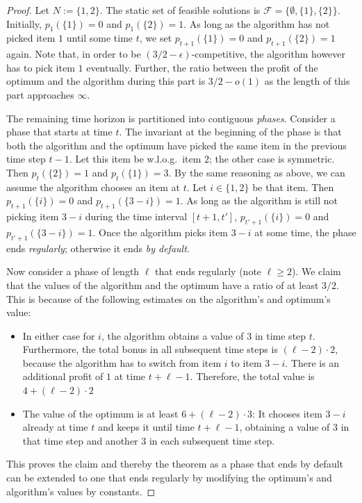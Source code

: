 \documentclass[a4paper]{book}
\newtheorem{proof}{\noindent{\bf Proof.} }
\begin{document}
\begin{proof}
	Let $N:=\{1,2\}$. The static set of feasible solutions is $\mathcal{F}=\{\emptyset,\{1\},\{2\}\}$. Initially, $p_1(\{1\})=0$ and $p_1(\{2\})=1$. As long as the algorithm has not picked item $1$ until some time $t$, we set $p_{t+1}(\{1\})=0$ and $p_{t+1}(\{2\})=1$ again. Note that, in order to be $(3/2-\epsilon)$-competitive, the algorithm however has to pick item $1$ eventually. Further, the ratio between the profit of the optimum and the algorithm during this part is $3/2-o(1)$ as the length of this part approaches $\infty$.
	
	The remaining time horizon is partitioned into contiguous \emph{phases}. Consider a phase that starts at time $t$. The invariant at the beginning of the phase is that both the algorithm and the optimum have picked the same item in the previous time step $t-1$. Let this item be w.l.o.g.\ item $2$; the other case is symmetric. Then $p_t(\{2\})=1$ and $p_t(\{1\})=3$. By the same reasoning as above, we can assume the algorithm chooses an item at $t$. Let $i\in\{1,2\}$ be that item. Then $p_{t+1}(\{i\})=0$ and $p_{t+1}(\{3-i\})=1$. As long as the algorithm is still not picking item $3-i$ during the time interval $[t+1,t']$, $p_{t'+1}(\{i\})=0$ and $p_{t'+1}(\{3-i\})=1$. Once the algorithm picks item $3-i$ at some time, the phase ends \emph{regularly}; otherwise it ends \emph{by default}.
	
	Now consider a phase of length $\ell$ that ends regularly (note $\ell\geq 2$). We claim that the values of the algorithm and the optimum have a ratio of at least $3/2$. This is because of the following estimates on the algorithm's and optimum's value:
	\begin{itemize}
	    \item In either case for $i$, the algorithm obtains a value of $3$ in time step $t$. Furthermore, the total bonus in all subsequent time steps is $(\ell-2)\cdot 2$, because the algorithm has to switch from item $i$ to item $3-i$. There is an additional profit of $1$ at time $t+\ell-1$. Therefore, the total value is $4+(\ell-2)\cdot 2$
	    \item The value of the optimum is at least $6+(\ell-2)\cdot 3$: It chooses item $3-i$ already at time $t$ and keeps it until time $t+\ell-1$, obtaining a value of $3$ in that time step and another $3$ in each subsequent time step.
	\end{itemize}
	This proves the claim and thereby the theorem as a phase that ends by default can be extended to one that ends regularly by modifying the optimum's and algorithm's values by constants. %
\end{proof}
\end{document}

